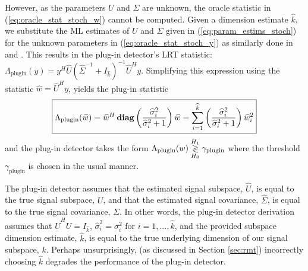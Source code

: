 However, as the parameters $U$ and $\Sigma$ are unknown, the oracle statistic in
(\ref{eq:oracle_stat_stoch_w}) cannot be computed. Given a dimension estimate
$\widehat{k}$, we substitute the ML estimates of $U$ and $\Sigma$ given in
(\ref{eq:param_estims_stoch}) for the unknown parameters in (\ref{eq:oracle_stat_stoch_y})
as similarly done in \cite{mcwhorter2003matched} and \cite{jin2005cfar}. This results in the plug-in detector's LRT statistic: $
\Lambda_{\text{plugin}}(y)= y^H\widehat{U}\left(\widehat{\Sigma}^{-1}+I_{\widehat{k}}\right)^{-1}\widehat{U}^Hy$. Simplifying this expression using the statistic $\widehat{w} = \widehat{U}^Hy$, yields the plug-in statistic
\begin{equation}\label{eq:plugin_stat_stoch}
\boxed{\Lambda_{\text{plugin}}(\widehat{w}) = \widehat{w}^H\diag\left(\frac{\widehat{\sigma}^2_i}{\widehat{\sigma}^2_i+1}\right)\widehat{w}=\sum_{i=1}^{\widehat{k}}\left(\frac{\widehat{\sigma}_i^2}{\widehat{\sigma}_i^2+1}\right)\widehat{w}_i^2}
\end{equation}
and the plug-in detector takes the form $\Lambda_{\text{plugin}}(w) \overset{H_1}{\underset{H_0}{\gtrless}} \gamma_{\text{plugin}}$
where the threshold $\gamma_{\text{plugin}}$ is chosen in the usual manner.

The plug-in detector assumes that the estimated signal subspace, $\widehat{U}$, is equal to the true signal subspace, $U$, and that the estimated signal covariance, $\widehat{\Sigma}$, is equal to the true signal covariance, $\Sigma$. In other words,  the plug-in detector derivation assumes that $\widehat{U}^HU=I_{\widehat{k}}$, $\widehat{\sigma}_i^2=\sigma_i^2$ for $i=1,\dots,\widehat{k}$, and the provided subspace dimension estimate, $\widehat{k}$, is equal to the true underlying dimension of our signal subspace, $k$. Perhaps unsurprisingly, (as discussed in Section \ref{sec:rmt}) incorrectly choosing $\widehat{k}$ degrades the performance of the plug-in detector.

